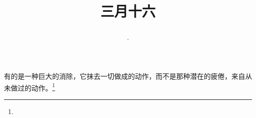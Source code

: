 \title{\date[d=24,m=4,y=2024][year:cn-y,年,month:cn,day:cn,日,·,weekday]·三月十六 }
有的是一种巨大的消除，它抹去一切做成的动作，而不是那种潜在的疲倦，来自从未做过的动作。\footnote{ }

